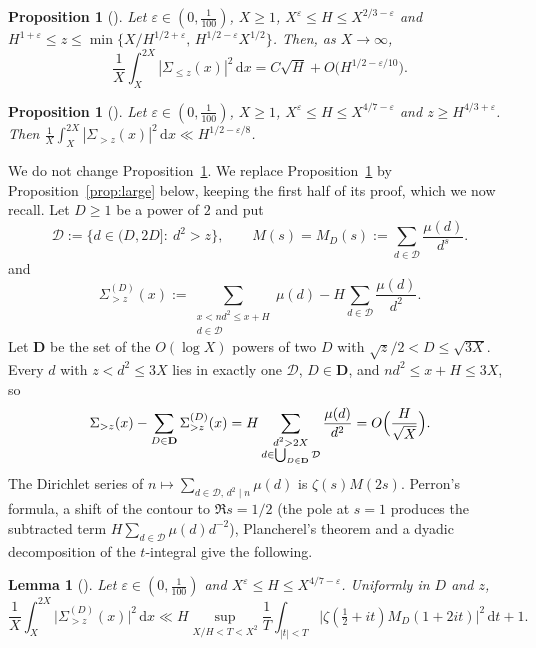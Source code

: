 \documentclass[11pt]{amsart}
\newtheorem{proposition}[theorem]{Proposition}
\newtheorem{lemma}[theorem]{Lemma}
\theoremstyle{remark}
\newcommand{\eps}{\varepsilon}
\newcommand{\dd}{\,\mathrm{d}}
\begin{document}
\begin{proposition}[{\cite[Proposition~1]{GMRR}}]\label{prop:small}
Let $\eps\in(0,\frac1{100})$, $X\ge1$, $X^\eps\le H\le X^{2/3-\eps}$ and
$H^{1+\eps}\le z\le\min\{X/H^{1/2+\eps},\,H^{1/2-\eps}X^{1/2}\}$.  Then, as
$X\to\infty$,
\[
  \frac1X\int_X^{2X}|\Sigma_{\le z}(x)|^2\dd x=C\sqrt H+O\bigl(H^{1/2-\eps/10}\bigr).
\]
\end{proposition}

\begin{proposition}[{\cite[Proposition~2]{GMRR}}]\label{prop:largeGMRR}
Let $\eps\in(0,\frac1{100})$, $X\ge1$, $X^\eps\le H\le X^{4/7-\eps}$ and
$z\ge H^{4/3+\eps}$.  Then
$\frac1X\int_X^{2X}|\Sigma_{>z}(x)|^2\dd x\ll H^{1/2-\eps/8}$.
\end{proposition}

We do not change Proposition~\ref{prop:small}.  We replace
Proposition~\ref{prop:largeGMRR} by Proposition~\ref{prop:large} below, keeping the first
half of its proof, which we now recall.  Let $D\ge 1$ be a power of $2$ and put
\[
  \mathcal D:=\{d\in(D,2D]:\ d^2>z\},\qquad M(s)=M_D(s):=\sum_{d\in\mathcal D}\frac{\mu(d)}{d^{s}}.
\]
and
\[
  \Sigma^{(D)}_{>z}(x):=\sum_{\substack{x<nd^2\le x+H\\ d\in\mathcal D}}\mu(d)-H\sum_{d\in\mathcal D}\frac{\mu(d)}{d^2}.
\]
Let $\mathbf D$ be the set of the $O(\log X)$ powers of two $D$ with
$\sqrt z/2<D\le\sqrt{3X}$.  Every $d$ with $z<d^2\le 3X$ lies in exactly one
$\mathcal D$, $D\in\mathbf D$, and $nd^2\le x+H\le 3X$, so
\begin{equation}\label{eq:dyadic}
  \Sigma_{>z}(x)-\sum_{D\in\mathbf D}\Sigma^{(D)}_{>z}(x)=H\sum_{\substack{d^2>2X\\ d\in\bigcup_{D\in\mathbf D}\mathcal D}}\frac{\mu(d)}{d^2}=O\Bigl(\frac H{\sqrt X}\Bigr).
\end{equation}
The Dirichlet series of
$n\mapsto\sum_{d\in\mathcal D,\,d^2\mid n}\mu(d)$ is $\zeta(s)M(2s)$.  Perron's
formula, a shift of the contour to $\Re s=1/2$ (the pole at $s=1$ produces the
subtracted term $H\sum_{d\in\mathcal D}\mu(d)d^{-2}$), Plancherel's theorem and
a dyadic decomposition of the $t$-integral give the following.

\begin{lemma}[{\cite[Section~5, up to display~(40)]{GMRR}}]\label{lem:reduction}
Let $\eps\in(0,\frac1{100})$ and $X^\eps\le H\le X^{4/7-\eps}$.  Uniformly in $D$ and $z$,
\[
  \frac1X\int_X^{2X}\bigl|\Sigma^{(D)}_{>z}(x)\bigr|^2\dd x
  \ll H\sup_{X/H<T<X^2}\frac1T\int_{|t|<T}\bigl|\zeta(\tfrac12+it)M_D(1+2it)\bigr|^2\dd t+1.
\]
\end{lemma}
\end{document}
